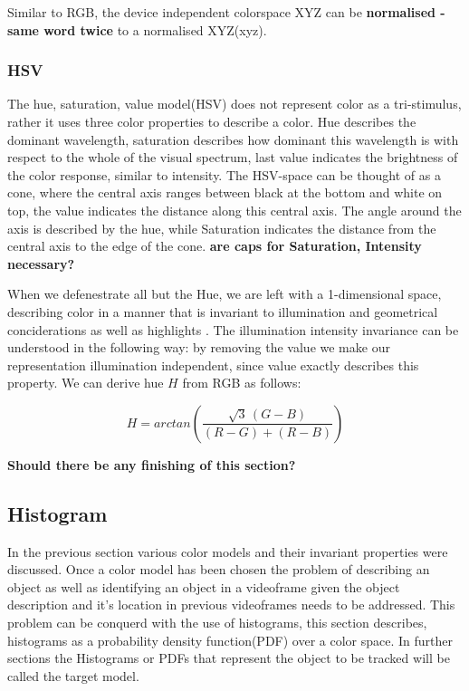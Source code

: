 \documentclass[a4paper,11pt]{article}
\begin{document}
Similar to RGB, the device independent colorspace XYZ can be \textbf{normalised - same word twice} to a normalised XYZ(xyz).		
		
\subsubsection{HSV}
The hue, saturation, value model(HSV) does not represent color as a tri-stimulus, rather it uses three color properties to describe a color. Hue describes the dominant wavelength, saturation describes how dominant this wavelength is with respect to the whole of the visual spectrum, last value indicates the brightness of the color response, similar to intensity. The HSV-space can be thought of as a cone, where the central axis ranges between black at the bottom and white on top, the value indicates the distance along this central axis. The angle around the axis is described by the hue, while Saturation indicates the distance from the central axis to the edge of the cone. \textbf{are caps for Saturation, Intensity necessary?}

When we defenestrate all but the Hue, we are left with a 1-dimensional space, describing color in a manner that is invariant to illumination and geometrical conciderations as well as highlights \cite{gevers_invariant}. The illumination intensity invariance can be understood in the following way: by removing the value we make our representation illumination independent, since value exactly describes this property. We can derive hue $H$ from RGB as follows:

\begin{equation}
\label{eq:hue}
H = arctan\left(\frac{\sqrt{3}\,(G-B)}{(R-G)+(R-B)}\right)
\end{equation} 

\textbf{Should there be any finishing of this section?}
		 
\subsection{Histogram}
In the previous section various color models and their invariant properties were discussed. Once a color model has been chosen the problem of describing an object as well as identifying an object in a videoframe given the object description and it's location in previous videoframes needs to be addressed. This problem can be conquerd with the use of histograms, this section describes, histograms as a probability density function(PDF) over a color space. In further sections the Histograms or PDFs that represent the object to be tracked will be called the target model.
\end{document}
